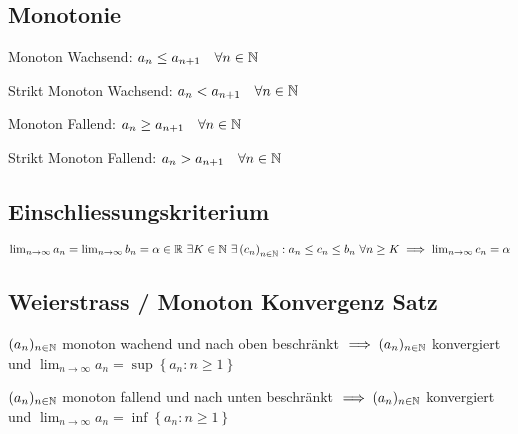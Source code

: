 \subsection{Monotonie}
\begin{compactdesc}
    \item[Monoton Wachsend:] $a_n \le a_{n+1} \quad \forall n \in \mathbb{N}$
    \item[Strikt Monoton Wachsend:] $a_n < a_{n+1} \quad \forall n \in \mathbb{N}$
    \item[Monoton Fallend:] $a_n \ge a_{n+1} \quad \forall n \in \mathbb{N}$
    \item[Strikt Monoton Fallend:] $a_n > a_{n+1} \quad \forall n \in \mathbb{N}$
\end{compactdesc}

\subsection{Einschliessungskriterium}
    $\lim_{n \to \infty} a_n = \lim_{n \to \infty} b_n = \alpha \in \mathbb{R} \ \exists K \in \mathbb{N} \ \exists \left( c_n \right)_{n \in \mathbb{N}}: a_n \le  c_n \le b_n \ \forall n \ge K \implies \lim_{n \to \infty} c_n = \alpha$

\subsection{Weierstrass / Monoton Konvergenz Satz}
\begin{compactitem}
   \item $(a_n)_{n \in \mathbb{N}}$ monoton wachend und nach oben beschränkt $\implies (a_n)_{n \in \mathbb{N}}$ konvergiert und $\lim_{n \to \infty} a_n = \sup \left\{ a_n : n \ge 1 \right\}$
   \item $(a_n)_{n \in \mathbb{N}}$ monoton fallend und nach unten beschränkt $\implies (a_n)_{n \in \mathbb{N}}$ konvergiert und $\lim_{n \to \infty} a_n = \inf \left\{ a_n : n \ge 1 \right\}$
\end{compactitem} 

